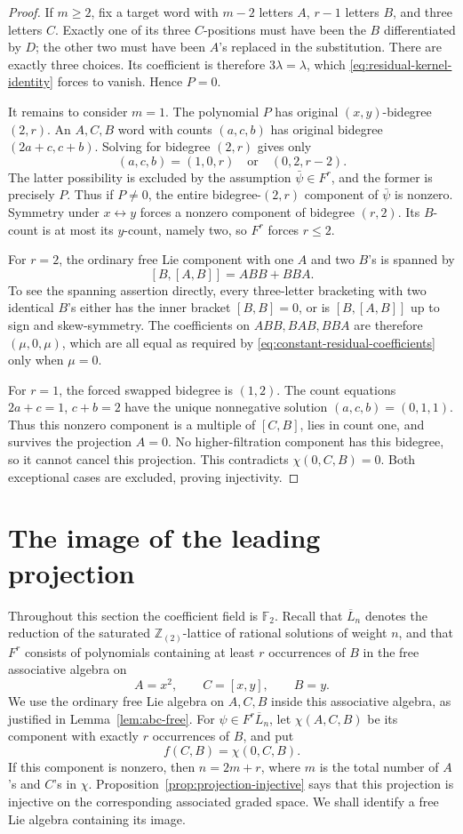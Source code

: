 \documentclass[11pt]{article}
\theoremstyle{definition}
\theoremstyle{remark}
\numberwithin{equation}{section}
\begin{document}
\begin{proof}
If $m\geq2$, fix a target word with $m-2$ letters $A$, $r-1$ letters
$B$, and three letters $C$.  Exactly one of its three $C$-positions
must have been the $B$ differentiated by $D$; the other two must have
been $A$'s replaced in the substitution.  There are exactly three
choices.  Its coefficient is therefore $3\lambda=\lambda$, which
\eqref{eq:residual-kernel-identity} forces to vanish.  Hence $P=0$.

It remains to consider $m=1$.  The polynomial $P$ has original
$(x,y)$-bidegree $(2,r)$.  An $A,C,B$ word with counts $(a,c,b)$ has
original bidegree $(2a+c,c+b)$.  Solving for bidegree $(2,r)$ gives
only
\[
 (a,c,b)=(1,0,r)\quad\text{or}\quad(0,2,r-2).
\]
The latter possibility is excluded by the assumption
$\bar\psi\in F^r$, and the former is precisely $P$.  Thus if $P\ne0$,
the entire bidegree-$(2,r)$ component of $\bar\psi$ is nonzero.
Symmetry under $x\leftrightarrow y$ forces a nonzero component of
bidegree $(r,2)$.  Its $B$-count is at most its $y$-count, namely two,
so $F^r$ forces $r\leq2$.

For $r=2$, the ordinary free Lie component with one $A$ and two $B$'s
is spanned by
\[
 [B,[A,B]]=ABB+BBA.
\]
To see the spanning assertion directly, every three-letter bracketing
with two identical $B$'s either has the inner bracket $[B,B]=0$, or
is $[B,[A,B]]$ up to sign and skew-symmetry.  The coefficients on
$ABB,BAB,BBA$ are therefore $(\mu,0,\mu)$, which are all equal as
required by \eqref{eq:constant-residual-coefficients} only when
$\mu=0$.

For $r=1$, the forced swapped bidegree is $(1,2)$.  The count equations
$2a+c=1$, $c+b=2$ have the unique nonnegative solution
$(a,c,b)=(0,1,1)$.  Thus this nonzero component is a multiple of
$[C,B]$, lies in count one, and survives the projection $A=0$.
No higher-filtration component has this bidegree, so it cannot cancel
this projection.  This contradicts $\chi(0,C,B)=0$.  Both exceptional
cases are excluded, proving injectivity.
\end{proof}

\section{The image of the leading projection}
\label{sec:image}

Throughout this section the coefficient field is ${\mathbb F_2}$.
Recall that $\overline L_n$ denotes the reduction of the saturated
$\mathbb Z_{(2)}$-lattice of rational solutions of weight $n$, and that
$F^r$ consists of polynomials containing at least $r$ occurrences of $B$
in the free associative algebra on
\[
 A=x^2,\qquad C=[x,y],\qquad B=y.
\]
We use the ordinary free Lie algebra on $A,C,B$ inside this associative
algebra, as justified in Lemma~\ref{lem:abc-free}.
For $\psi\in F^r\overline L_n$, let $\chi(A,C,B)$ be its component
with exactly $r$ occurrences of $B$, and put
\[
 f(C,B)=\chi(0,C,B).
\]
If this component is nonzero, then $n=2m+r$, where $m$ is the total
number of $A$'s and $C$'s in $\chi$.
Proposition~\ref{prop:projection-injective} says that this projection
is injective on the corresponding associated graded space.
We shall identify a free Lie algebra containing its image.
\end{document}
